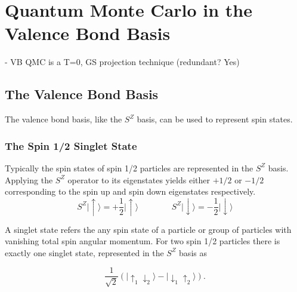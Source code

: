 \chapter{Quantum Monte Carlo in the Valence Bond Basis}

{\color{red} - VB QMC is a T=0, GS projection technique (redundant? Yes)}
\\
\section{The Valence Bond Basis}

{\color{red} The valence bond basis, like the $S^Z$ basis, can be used to represent spin states.}

\subsection{The Spin 1/2 Singlet State}


Typically the spin states of spin 1/2 particles are represented in the $S^Z$ basis.  Applying the
$S^Z$ operator to its eigenstates yields either $+1/2$ or $-1/2$ corresponding to the spin up
and spin down eigenstates respectively.
\begin{equation}
   S^Z\lvert \uparrow \rangle = +\frac{1}{2} \lvert \uparrow \rangle
   \:\:\:    \:\:\:    \:\:\:    \:\:\:    \:\:\:    \:\:\: 
   S^Z\lvert \downarrow \rangle = -\frac{1}{2} \lvert \downarrow \rangle
   \label{SZ}
\end{equation}

A singlet state refers the any spin state of a particle or group of particles with vanishing total spin angular momentum.
For two spin 1/2 particles there is exactly one singlet state, represented in the $S^Z$ basis as

\begin{equation}
  \frac{1}{\sqrt{2}}\left( \lvert \uparrow_1 \downarrow_2 \rangle - \lvert \downarrow_1 \uparrow_2 \rangle \right) .
   \label{singlet}
\end{equation}


